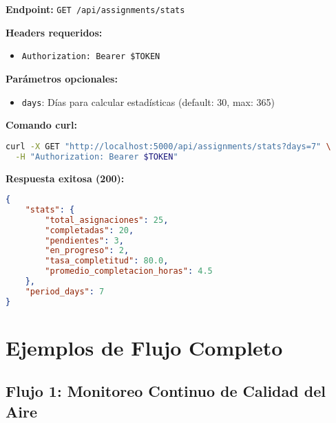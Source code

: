 \documentclass[12pt,a4paper]{article}
\begin{document}
\textbf{Endpoint:} \texttt{GET /api/assignments/stats}

\textbf{Headers requeridos:}
\begin{itemize}
\item \texttt{Authorization: Bearer \$TOKEN}
\end{itemize}

\textbf{Parámetros opcionales:}
\begin{itemize}
\item \texttt{days}: Días para calcular estadísticas (default: 30, max: 365)
\end{itemize}

\textbf{Comando curl:}
\begin{lstlisting}[language=bash]
curl -X GET "http://localhost:5000/api/assignments/stats?days=7" \
  -H "Authorization: Bearer $TOKEN"
\end{lstlisting}

\textbf{Respuesta exitosa (200):}
\begin{lstlisting}[language=JSON]
{
    "stats": {
        "total_asignaciones": 25,
        "completadas": 20,
        "pendientes": 3,
        "en_progreso": 2,
        "tasa_completitud": 80.0,
        "promedio_completacion_horas": 4.5
    },
    "period_days": 7
}
\end{lstlisting}

\section{Ejemplos de Flujo Completo}

\subsection{Flujo 1: Monitoreo Continuo de Calidad del Aire}
\end{document}
